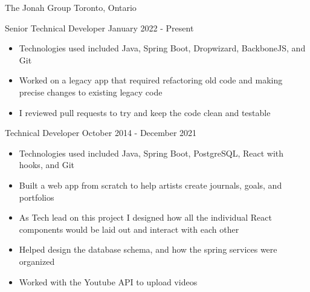 
\begin{cventries}
    \cventry
    {The Jonah Group}
    {Toronto, Ontario}
    {
        \cvposition
            {Senior Technical Developer}
            {January 2022 - Present}
            {
                \renewcommand{\labelitemii}{\bullet}
                \begin{cvitems}
                    \item[] {
                        \begin{itemize}
                            \item {Technologies used included Java, Spring Boot, Dropwizard, BackboneJS, and Git}
                            \item {Worked on a legacy app that required refactoring old code and making precise changes to existing legacy code}
                            \item {I reviewed pull requests to try and keep the code clean and testable}
                        \end{itemize}
                    }
                \end{cvitems}
            }
        \cvposition
            {Technical Developer}
            {October 2014 - December 2021}
            {
                \renewcommand{\labelitemii}{\bullet}
                \begin{cvitems}
                    \item[] {
                        \begin{itemize}
                            \item {Technologies used included Java, Spring Boot, PostgreSQL, React with hooks, and Git}
                            \item {Built a web app from scratch to help artists create journals, goals, and portfolios}
                            \item {As Tech lead on this project I designed how all the individual React components would be laid out and interact with each other}
                            \item {Helped design the database schema, and how the spring services were organized}
                            \item {Worked with the Youtube API to upload videos}
                        \end{itemize}
}
\end{cvitems}}}
\end{cventries}
